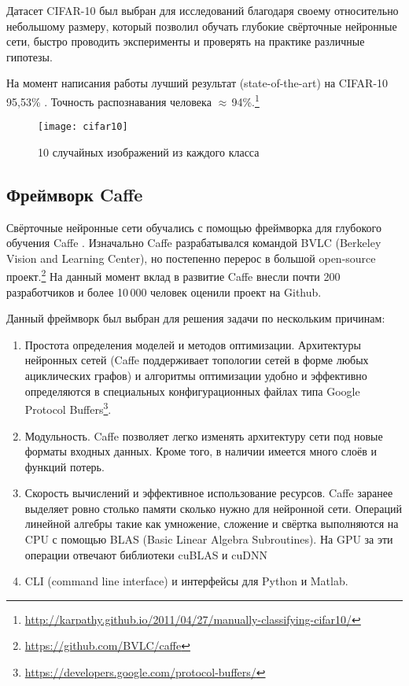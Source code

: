 Датасет CIFAR-10 \cite{learningmultiple} был выбран для исследований благодаря своему относительно небольшому размеру, 
который позволил обучать глубокие свёрточные нейронные сети, быстро проводить эксперименты и проверять на практике различные гипотезы.

На момент написания работы лучший результат (state-of-the-art) на CIFAR-10 95,53\% \cite{2014arXiv1412}. Точность  
распознавания человека $\approx$\,94\%.\footnote{\url{http://karpathy.github.io/2011/04/27/manually-classifying-cifar10/}}

\begin{figure}[H]
\centering
\texttt{[image: cifar10]}
\caption{10 случайных изображений из каждого класса}
\end{figure}

\subsection{Фреймворк Caffe}
Свёрточные нейронные сети обучались с помощью фреймворка для глубокого обучения Caffe \cite{jia2014caffe}.
Изначально Caffe разрабатывался командой BVLC (Berkeley Vision and Learning Center), но постепенно перерос в большой 
open-source проект.\footnote{\url{https://github.com/BVLC/caffe}} На данный момент вклад в развитие Caffe внесли почти 200 
разработчиков и более 10\,000 человек оценили проект на Github.

Данный фреймворк был выбран для решения задачи по нескольким причинам:
\begin{enumerate}
    \item Простота определения моделей и методов оптимизации. Архитектуры нейронных сетей
    (Caffe поддерживает топологии сетей в форме любых ациклических графов) и алгоритмы оптимизации удобно и 
    эффективно определяются в специальных конфигурационных файлах типа Google Protocol 
    Buffers\footnote{\url{https://developers.google.com/protocol-buffers/}}. 
    \item Модульность. Caffe позволяет легко изменять архитектуру сети под новые форматы входных данных. Кроме того, в наличии 
    имеется много слоёв и функций потерь.
    \item Скорость вычислений и эффективное использование ресурсов. Caffe заранее выделяет ровно столько памяти сколько нужно для 
    нейронной сети. Операций линейной алгебры такие как умножение, сложение и свёртка выполняются на CPU с помощью BLAS (Basic 
    Linear Algebra Subroutines). На GPU за эти операции отвечают библиотеки cuBLAS и cuDNN 
    \cite{DBLP:journals/corr/ChetlurWVCTCS14}
    \item CLI (command line interface) и интерфейсы для Python и Matlab.
\end{enumerate}

